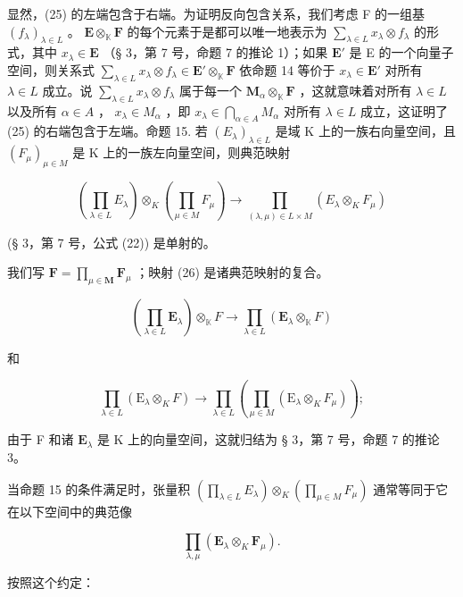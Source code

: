 显然，(25) 的左端包含于右端。为证明反向包含关系，我们考虑 F 的一组基 \((f_{\lambda})_{\lambda \in L}\) 。 \(\mathbf{E} \otimes_{\mathbb{K}} \mathbf{F}\) 的每个元素于是都可以唯一地表示为 \(\sum_{\lambda \in L} x_{\lambda} \otimes f_{\lambda}\) 的形式，其中 \(x_{\lambda} \in \mathbf{E}\) （§ 3，第 7 号，命题 7 的推论 1）；如果 \(\mathbf{E}'\) 是 E 的一个向量子空间，则关系式 \(\sum_{\lambda \in L} x_{\lambda} \otimes f_{\lambda} \in \mathbf{E}' \otimes_{\mathbb{K}} \mathbf{F}\) 依命题 14 等价于 \(x_{\lambda} \in \mathbf{E}'\) 对所有 \(\lambda \in L\) 成立。说 \(\sum_{\lambda \in L} x_{\lambda} \otimes f_{\lambda}\) 属于每一个 \(\mathbf{M}_{\alpha} \otimes_{\mathbb{K}} \mathbf{F}\) ，这就意味着对所有 \(\lambda \in L\) 以及所有 \(\alpha \in A\) ， \(x_{\lambda} \in M_{\alpha}\) ，即 \(x_{\lambda} \in \bigcap_{\alpha \in A} M_{\alpha}\) 对所有 \(\lambda \in L\) 成立，这证明了 (25) 的右端包含于左端。命题 15. 若 \((E_{\lambda})_{\lambda \in L}\) 是域 K 上的一族右向量空间，且 \((F_{\mu})_{\mu \in M}\) 是 K 上的一族左向量空间，则典范映射

\[
\left(\prod_ {\lambda \in L} E _ {\lambda}\right) \otimes_ {K} \left(\prod_ {\mu \in M} F _ {\mu}\right)\rightarrow \prod_ {(\lambda , \mu) \in L \times M} (E _ {\lambda} \otimes_ {K} F _ {\mu})\tag{26}
\]

(§ 3，第 7 号，公式 (22)) 是单射的。

我们写 \(\mathbf{F} = \prod_{\mu \in \mathbf{M}} \mathbf{F}_{\mu}\) ；映射 (26) 是诸典范映射的复合。

\[
\left(\prod_ {\lambda \in L} \mathbf {E} _ {\lambda}\right) \otimes_ {\mathbb {K}} F \rightarrow \prod_ {\lambda \in L} \left(\mathbf {E} _ {\lambda} \otimes_ {\mathbb {K}} F\right)
\]

和

\[
\prod_ {\lambda \in L} \left(\mathrm{E} _ {\lambda} \otimes_ {K} F\right)\rightarrow \prod_ {\lambda \in L} \left(\prod_ {\mu \in M} \left(\mathrm{E} _ {\lambda} \otimes_ {K} F _ {\mu}\right)\right);
\]

由于 F 和诸 \(\mathbf{E}_{\lambda}\) 是 K 上的向量空间，这就归结为 § 3，第 7 号，命题 7 的推论 3。

当命题 15 的条件满足时，张量积 \(\left(\prod_{\lambda \in L} E_{\lambda}\right) \otimes_{K} \left(\prod_{\mu \in M} F_{\mu}\right)\) 通常等同于它在以下空间中的典范像

\[
\prod_ {\lambda , \mu} (\mathbf {E} _ {\lambda} \otimes_ {K} \mathbf {F} _ {\mu}).
\]

按照这个约定：

